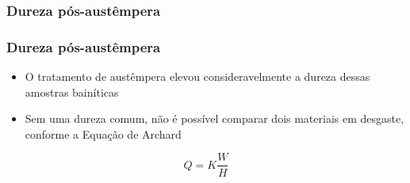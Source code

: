 \documentclass{beamer}
\begin{document}
\begin{frame}
\frametitle{Dureza pós-austêmpera}

\begin{table}[H]
	\centering
	\caption{Leituras obtidas para as amostras perlíticas e para as amostras bainíticas (pós tratamento de austêmpera).}
	\label{tab:dureza_pos_austempera}%
\end{table}%

\end{frame}

\begin{frame}
\frametitle{Dureza pós-austêmpera}

\begin{itemize}
	\item O tratamento de austêmpera elevou consideravelmente a dureza dessas amostras bainíticas
	\item Sem uma dureza comum, não é possível comparar dois materiais em desgaste, conforme a Equação de Archard
\end{itemize}

\begin{equation}
Q = K\frac{W}{H}
\end{equation}


\end{frame}
\end{document}
